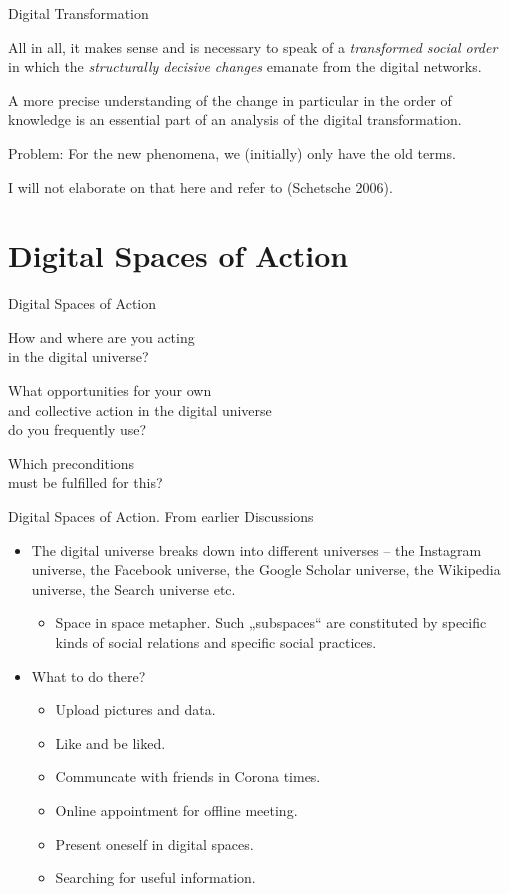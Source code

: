 \documentclass{beamer}
\begin{document}
\begin{frame}{Digital Transformation}

All in all, it makes sense and is necessary to speak of a \emph{transformed
  social order} in which the \emph{structurally decisive changes} emanate from
the digital networks.

  A more precise understanding of the change in particular in the order of
  knowledge is an essential part of an analysis of the digital transformation.

  Problem: For the new phenomena, we (initially) only have the old terms.

  I will not elaborate on that here and refer to (Schetsche 2006).

\end{frame}

\section{Digital Spaces of Action}
\begin{frame}{Digital Spaces of Action}\centering\Large\bf

  How and where are you acting\\ in the digital universe?

  What opportunities for your own\\ and collective action in the digital
  universe\\ do you frequently use?

  Which preconditions\\ must be fulfilled for this?
\end{frame}
\begin{frame}{Digital Spaces of Action. From earlier Discussions}
  \begin{itemize}
  \item The digital universe breaks down into different universes -- the
    Instagram universe, the Facebook universe, the Google Scholar universe,
    the Wikipedia universe, the Search universe etc.
    \begin{itemize}
    \item Space in space metapher. Such „subspaces“ are constituted by specific
      kinds of social relations and specific social practices.
    \end{itemize}
  \item What to do there?
    \begin{itemize}
    \item Upload pictures and data.
    \item Like and be liked.
    \item Communcate with friends in Corona times.
    \item Online appointment for offline meeting.
    \item Present oneself in digital spaces.
    \item Searching for useful information.
    \end{itemize}
  \end{itemize}
\end{frame}
\end{document}
